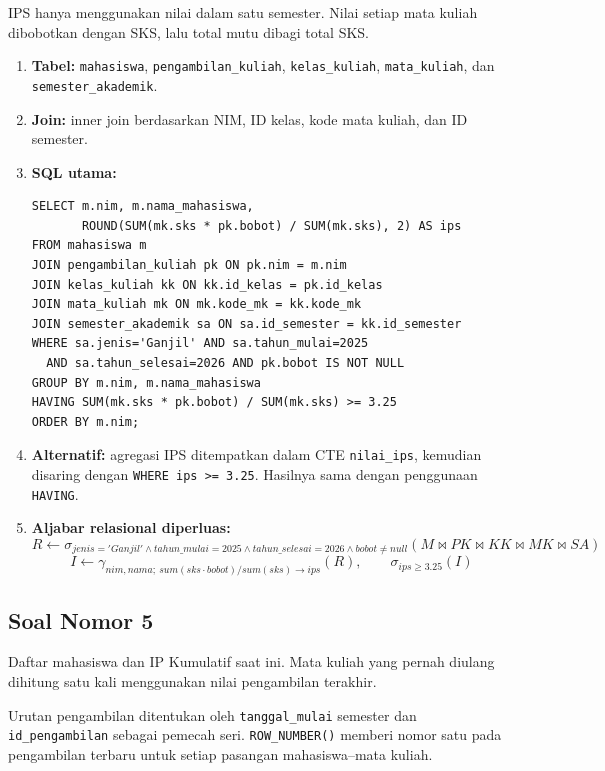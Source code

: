 IPS hanya menggunakan nilai dalam satu semester. Nilai setiap mata kuliah dibobotkan dengan SKS, lalu total mutu dibagi total SKS.

\begin{enumerate}[noitemsep]
\item \textbf{Tabel:} \texttt{mahasiswa}, \texttt{pengambilan\_kuliah}, \texttt{kelas\_kuliah}, \texttt{mata\_kuliah}, dan \texttt{semester\_akademik}.
\item \textbf{Join:} inner join berdasarkan NIM, ID kelas, kode mata kuliah, dan ID semester.
\item \textbf{SQL utama:}
\begin{lstlisting}
SELECT m.nim, m.nama_mahasiswa,
       ROUND(SUM(mk.sks * pk.bobot) / SUM(mk.sks), 2) AS ips
FROM mahasiswa m
JOIN pengambilan_kuliah pk ON pk.nim = m.nim
JOIN kelas_kuliah kk ON kk.id_kelas = pk.id_kelas
JOIN mata_kuliah mk ON mk.kode_mk = kk.kode_mk
JOIN semester_akademik sa ON sa.id_semester = kk.id_semester
WHERE sa.jenis='Ganjil' AND sa.tahun_mulai=2025
  AND sa.tahun_selesai=2026 AND pk.bobot IS NOT NULL
GROUP BY m.nim, m.nama_mahasiswa
HAVING SUM(mk.sks * pk.bobot) / SUM(mk.sks) >= 3.25
ORDER BY m.nim;
\end{lstlisting}
\item \textbf{Alternatif:} agregasi IPS ditempatkan dalam CTE \texttt{nilai\_ips}, kemudian disaring dengan \texttt{WHERE ips >= 3.25}. Hasilnya sama dengan penggunaan \texttt{HAVING}.
\item \textbf{Aljabar relasional diperluas:}
\[
R\leftarrow\sigma_{jenis='Ganjil'\wedge tahun\_mulai=2025\wedge tahun\_selesai=2026\wedge bobot\ne null}
(M\bowtie PK\bowtie KK\bowtie MK\bowtie SA)
\]
\[
I\leftarrow\gamma_{nim,nama;\ sum(sks\cdot bobot)/sum(sks)\rightarrow ips}(R),\qquad
\sigma_{ips\ge3.25}(I)
\]
\end{enumerate}

\subsection{Soal Nomor 5}
\begin{tcolorbox}
Daftar mahasiswa dan IP Kumulatif saat ini. Mata kuliah yang pernah diulang dihitung satu kali menggunakan nilai pengambilan terakhir.
\end{tcolorbox}

Urutan pengambilan ditentukan oleh \texttt{tanggal\_mulai} semester dan \texttt{id\_pengambilan} sebagai pemecah seri. \texttt{ROW\_NUMBER()} memberi nomor satu pada pengambilan terbaru untuk setiap pasangan mahasiswa--mata kuliah.

